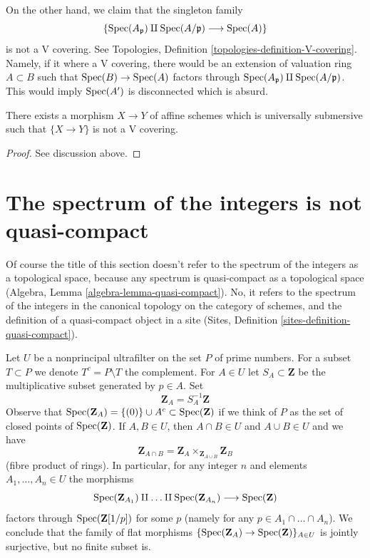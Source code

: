 \medskip\noindent
On the other hand, we claim that the singleton family
$$
\{\mathop{\mathrm{Spec}}(A_\mathfrak p) \amalg \mathop{\mathrm{Spec}}(A/\mathfrak p) \longrightarrow \mathop{\mathrm{Spec}}(A)\}
$$
is not a V covering. See
Topologies, Definition \ref{topologies-definition-V-covering}.
Namely, if it where a V covering, there would
be an extension of valuation ring $A \subset B$ such that
$\mathop{\mathrm{Spec}}(B) \to \mathop{\mathrm{Spec}}(A)$ factors through
$\mathop{\mathrm{Spec}}(A_\mathfrak p) \amalg \mathop{\mathrm{Spec}}(A/\mathfrak p)$.
This would imply $\mathop{\mathrm{Spec}}(A')$ is disconnected which is absurd.

\begin{lemma}
\label{lemma-universally-submersive-not-V}
There exists a morphism $X \to Y$ of affine schemes
which is universally submersive such that $\{X \to Y\}$
is not a V covering.
\end{lemma}

\begin{proof}
See discussion above.
\end{proof}









\section{The spectrum of the integers is not quasi-compact}
\label{section-canonical}

\noindent
Of course the title of this section doesn't refer to
the spectrum of the integers as a topological space,
because any spectrum is quasi-compact as a topological space
(Algebra, Lemma \ref{algebra-lemma-quasi-compact}).
No, it refers to the spectrum of the integers in the
canonical topology on the category of schemes, and the
definition of a quasi-compact object in a site
(Sites, Definition \ref{sites-definition-quasi-compact}).

\medskip\noindent
Let $U$ be a nonprincipal ultrafilter on the set $P$ of prime numbers.
For a subset $T \subset P$ we denote $T^c = P \setminus T$ the complement.
For $A \in U$ let $S_A \subset \mathbf{Z}$ be the multiplicative
subset generated by $p \in A$. Set
$$
\mathbf{Z}_A = S_A^{-1}\mathbf{Z}
$$
Observe that $\mathop{\mathrm{Spec}}(\mathbf{Z}_A) = \{(0)\} \cup A^c \subset \mathop{\mathrm{Spec}}(\mathbf{Z})$
if we think of $P$ as the set of closed points of $\mathop{\mathrm{Spec}}(\mathbf{Z})$.
If $A, B \in U$, then $A \cap B \in U$ and $A \cup B \in U$
and we have
$$
\mathbf{Z}_{A \cap B} =
\mathbf{Z}_A \times_{\mathbf{Z}_{A \cup B}} \mathbf{Z}_B
$$
(fibre product of rings). In particular, for any
integer $n$ and elements $A_1, \ldots, A_n \in U$ the morphisms
$$
\mathop{\mathrm{Spec}}(\mathbf{Z}_{A_1}) \amalg \ldots \amalg \mathop{\mathrm{Spec}}(\mathbf{Z}_{A_n})
\longrightarrow \mathop{\mathrm{Spec}}(\mathbf{Z})
$$
factors through $\mathop{\mathrm{Spec}}(\mathbf{Z}[1/p])$ for some $p$
(namely for any $p \in A_1 \cap \ldots \cap A_n$).
We conclude that the family of flat morphisms
$\{\mathop{\mathrm{Spec}}(\mathbf{Z}_A) \to \mathop{\mathrm{Spec}}(\mathbf{Z})\}_{A \in U}$ is jointly
surjective, but no finite subset is.

